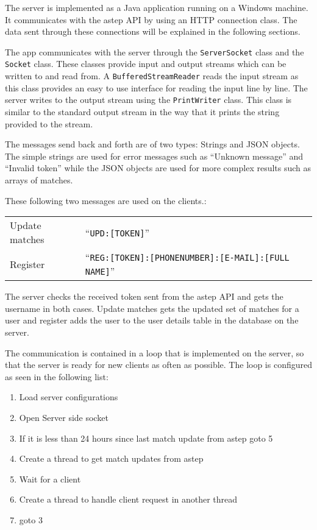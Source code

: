 The server is implemented as a Java application running on a Windows machine.
It communicates with the \gls{astep} API by using an HTTP connection class.
The data sent through these connections will be explained in the following sections.

The app communicates with the server through the \texttt{ServerSocket} class and the \texttt{Socket} class.
These classes provide input and output streams which can be written to and read from.
A \texttt{BufferedStreamReader} reads the input stream as this class provides an easy to use interface for reading the input line by line.
The server writes to the output stream using the \texttt{PrintWriter} class.
This class is similar to the standard output stream in the way that it prints the string provided to the stream.

The messages send back and forth are of two types: Strings and JSON objects.
The simple strings are used for error messages such as \enquote{Unknown message} and \enquote{Invalid token} while the JSON objects are used for more complex results such as arrays of matches.

These following two messages are used on the clients.:

{\centering
	\begin{tabular}{l l}
		Update matches & \enquote{\texttt{UPD:[TOKEN]}}\\
		Register & \enquote{\texttt{REG:[TOKEN]:[PHONENUMBER]:[E-MAIL]:[FULL NAME]}}
	\end{tabular}
}

The server checks the received token sent from the \gls{astep} API and gets the username in both cases.
Update matches gets the updated set of matches for a user and register adds the user to the user details table in the database on the server.

The communication is contained in a loop that is implemented on the server, so that the server is ready for new clients as often as possible.
The loop is configured as seen in the following list:

\begin{enumerate}
	\item Load server configurations
	\item Open Server side socket
	\item If it is less than 24 hours since last match update from \gls{astep} goto 5
	\item Create a thread to get match updates from \gls{astep}
	\item Wait for a client
	\item Create a thread to handle client request in another thread
	\item goto 3
\end{enumerate}


